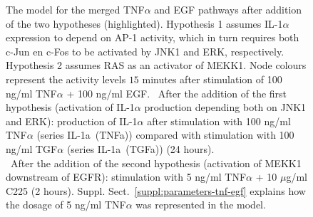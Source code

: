 \begin{figure}[!tpb]
\begin{center}
\end{center}
\caption{\scriptsize
{\bf \protect{}} The model for the merged TNF$\alpha$ and EGF pathways
after addition of the two hypotheses (highlighted).
Hypothesis 1 assumes IL-1$\alpha$ expression to depend on AP-1 activity, which in turn requires
both c-Jun en c-Fos to be activated by JNK1 and ERK, respectively. Hypothesis 2 assumes RAS as an activator
of MEKK1. Node colours represent the activity levels $15$ minutes
after stimulation of 100 ng/ml TNF$\alpha$ + 100 ng/ml EGF.
{\bf \protect{}}~After the addition of the first hypothesis (activation of IL-1$\alpha$ production depending both
on JNK1 and ERK): production of IL-1$\alpha$ after stimulation with 100 ng/ml TNF$\alpha$ (series {\sf IL-1a~(TNFa)})
compared with stimulation with 100 ng/ml TGF$\alpha$ (series {\sf IL-1a~(TGFa)}) (24 hours).\\
{\bf \protect{}}~After the addition of the second hypothesis (activation of MEKK1 downstream of EGFR):
stimulation with 5 ng/ml TNF$\alpha$ + 10 $\mu$g/ml C225 (2 hours).
Suppl. Sect.~\ref{suppl:parameters-tnf-egf} explains how the dosage of 5 ng/ml TNF$\alpha$ was represented in the model.}\label{fig:large-model-graph}
\end{figure}


